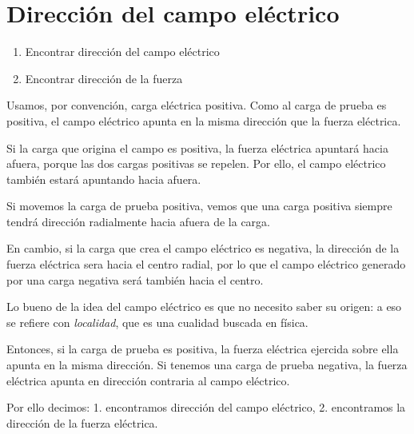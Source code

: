 \section{Dirección del campo eléctrico}

\begin{enumerate}
    \item Encontrar dirección del campo eléctrico
    \item Encontrar dirección de la fuerza
\end{enumerate}

Usamos,
por convención,
carga eléctrica positiva.
Como al carga de prueba es positiva,
el campo eléctrico apunta en la misma dirección que la fuerza eléctrica.

Si la carga que origina el campo es positiva,
la fuerza eléctrica apuntará hacia afuera,
porque las dos cargas positivas se repelen.
Por ello,
el campo eléctrico también estará apuntando hacia afuera.

Si movemos la carga de prueba positiva,
vemos que una carga positiva siempre tendrá dirección radialmente hacia afuera de la carga.

En cambio,
si la carga que crea el campo eléctrico es negativa,
la dirección de la fuerza eléctrica sera hacia el centro radial,
por lo que el campo eléctrico generado por una carga negativa será también hacia el centro.

Lo bueno de la idea del campo eléctrico es que no necesito saber su origen:
a eso se refiere con \textit{localidad},
que es una cualidad buscada en física.

Entonces,
si la carga de prueba es positiva,
la fuerza eléctrica ejercida sobre ella apunta en la misma dirección.
Si tenemos una carga de prueba negativa,
la fuerza eléctrica apunta en dirección contraria al campo eléctrico.

Por ello decimos:
1. encontramos dirección del campo eléctrico,
2. encontramos la dirección de la fuerza eléctrica.
